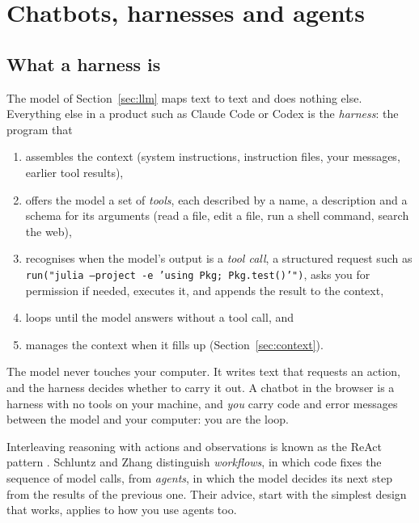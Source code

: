 \section{Chatbots, harnesses and agents}\label{sec:agents}


\subsection{What a harness is}

The model of Section~\ref{sec:llm} maps text to text and does nothing else. Everything
else in a product such as Claude Code or Codex is the \emph{harness}: the program that
\begin{enumerate}
  \item assembles the context (system instructions, instruction files, your messages,
        earlier tool results),
  \item offers the model a set of \emph{tools}, each described by a name, a description
        and a schema for its arguments (read a file, edit a file, run a shell command,
        search the web),
  \item recognises when the model's output is a \emph{tool call}, a structured request
        such as \texttt{run("julia --project -e 'using Pkg; Pkg.test()'")}, asks you for
        permission if needed, executes it, and appends the result to the context,
  \item loops until the model answers without a tool call, and
  \item manages the context when it fills up (Section~\ref{sec:context}).
\end{enumerate}
The model never touches your computer. It writes text that requests an action, and the
harness decides whether to carry it out. A chatbot in the browser is a harness with no
tools on your machine, and \emph{you} carry code and error messages between the model and
your computer: you are the loop.

Interleaving reasoning with actions and observations is known as the ReAct pattern
. Schluntz and Zhang  distinguish \emph{workflows}, in which code
fixes the sequence of model calls, from \emph{agents}, in which the model decides its next
step from the results of the previous one. Their advice, start with the simplest design
that works, applies to how you use agents too.

